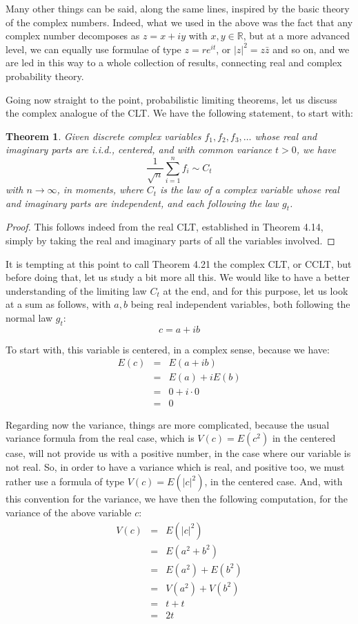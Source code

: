 \documentclass[12pt]{amsbook}
\newtheorem{theorem}{Theorem}[chapter]
\begin{document}
Many other things can be said, along the same lines, inspired by the basic theory of the complex numbers. Indeed, what we used in the above was the fact that any complex number decomposes as $z=x+iy$ with $x,y\in\mathbb R$, but at a more advanced level, we can equally use formulae of type $z=re^{it}$, or $|z|^2=z\bar{z}$ and so on, and we are led in this way to a whole collection of results, connecting real and complex probability theory.

\bigskip

Going now straight to the point, probabilistic limiting theorems, let us discuss the complex analogue of the CLT. We have the following statement, to start with:

\begin{theorem}
Given discrete complex variables $f_1,f_2,f_3,\ldots$ whose real and imaginary parts are i.i.d., centered, and with common variance $t>0$, we have
$$\frac{1}{\sqrt{n}}\sum_{i=1}^nf_i\sim C_t$$
with $n\to\infty$, in moments, where $C_t$ is the law of a complex variable whose real and imaginary parts are independent, and each following the law $g_t$.
\end{theorem}

\begin{proof}
This follows indeed from the real CLT, established in Theorem 4.14, simply by taking the real and imaginary parts of all the variables involved.
\end{proof}

It is tempting at this point to call Theorem 4.21 the complex CLT, or CCLT, but before doing that, let us study a bit more all this. We would like to have a better understanding of the limiting law $C_t$ at the end, and for this purpose, let us look at a sum as follows, with $a,b$ being real independent variables, both following the normal law $g_t$:
$$c=a+ib$$

To start with, this variable is centered, in a complex sense, because we have:
\begin{eqnarray*}
E(c)
&=&E(a+ib)\\
&=&E(a)+iE(b)\\
&=&0+i\cdot 0\\
&=&0
\end{eqnarray*}

Regarding now the variance, things are more complicated, because the usual variance formula from the real case, which is $V(c)=E(c^2)$ in the centered case, will not provide us with a positive number, in the case where our variable is not real. So, in order to have a variance which is real, and positive too, we must rather use a formula of type $V(c)=E(|c|^2)$, in the centered case. And, with this convention for the variance, we have then the following computation, for the variance of the above variable $c$:
\begin{eqnarray*}
V(c)
&=&E(|c|^2)\\
&=&E(a^2+b^2)\\
&=&E(a^2)+E(b^2)\\
&=&V(a^2)+V(b^2)\\
&=&t+t\\
&=&2t
\end{eqnarray*}
\end{document}
